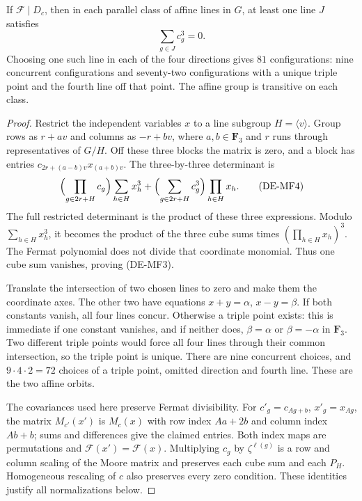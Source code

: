 \begin{lemma}
\label{lem:DE-Fermat-affine-lines}
If \(\mathcal F\mid D_c\), then in each parallel class of
affine lines in \(G\), at least one line \(J\) satisfies
\[
                         \sum_{g\in J}c_g^3=0.       \tag{DE-MF3}
\]
Choosing one such line in each of the four directions gives
\(81\) configurations: nine concurrent configurations and
seventy-two configurations with a unique triple point and
the fourth line off that point. The affine group is transitive
on each class.
\end{lemma}
\begin{proof}
Restrict the independent variables \(x\) to a line subgroup
\(H=\langle v\rangle\). Group rows as \(r+av\) and columns
as \(-r+bv\), where \(a,b\in\mathbf F_3\) and \(r\) runs
through representatives of \(G/H\). Off these three blocks
the matrix is zero, and a block has entries
\(c_{2r+(a-b)v}x_{(a+b)v}\). The three-by-three determinant is
\[
 \Bigl(\prod_{g\in2r+H}c_g\Bigr)\sum_{h\in H}x_h^3
 +\Bigl(\sum_{g\in2r+H}c_g^3\Bigr)\prod_{h\in H}x_h.
 \tag{DE-MF4}
\]
The full restricted determinant is the product of these three
expressions. Modulo \(\sum_{h\in H}x_h^3\), it becomes the
product of the three cube sums times \((\prod_{h\in H}x_h)^3\).
The Fermat polynomial does not divide that coordinate monomial.
Thus one cube sum vanishes, proving (DE-MF3).

Translate the intersection of two chosen lines to zero and
make them the coordinate axes. The other two have equations
\(x+y=\alpha\), \(x-y=\beta\). If both constants vanish,
all four lines concur. Otherwise a triple point exists:
this is immediate if one constant vanishes, and if neither
does, \(\beta=\alpha\) or \(\beta=-\alpha\) in \(\mathbf F_3\).
Two different triple points would force all four lines through
their common intersection, so the triple point is unique.
There are nine concurrent choices, and
\(9\cdot4\cdot2=72\) choices of a triple point, omitted
direction and fourth line. These are the two affine orbits.

The covariances used here preserve Fermat divisibility. For
\(c'_g=c_{Ag+b}\), \(x'_g=x_{Ag}\), the matrix
\(M_{c'}(x')\) is \(M_c(x)\) with row index \(Aa+2b\)
and column index \(Ab+b\); sums and differences give the
claimed entries. Both index maps are permutations and
\(\mathcal F(x')=\mathcal F(x)\). Multiplying \(c_g\) by
\(\zeta^{\ell(g)}\) is a row and column scaling of the Moore
matrix and preserves each cube sum and each \(P_H\).
Homogeneous rescaling of \(c\) also preserves every zero
condition. These identities justify all normalizations below.
\end{proof}


